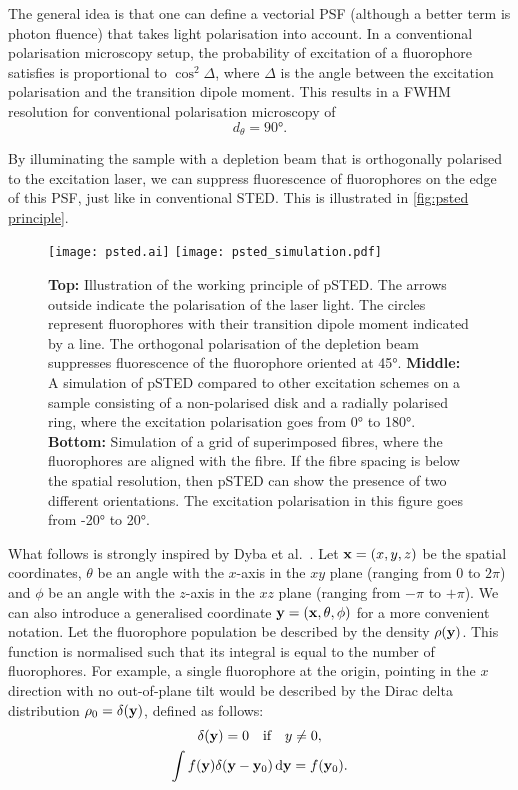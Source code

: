 The general idea is that one can define a vectorial PSF (although a better term is photon fluence) that takes light polarisation into account. In a conventional polarisation microscopy setup, the probability of excitation of a fluorophore satisfies is proportional to $ \cos^2 \Delta $, where $ \Delta $ is the angle between the excitation polarisation and the transition dipole moment. This results in a FWHM resolution for conventional polarisation microscopy of 
\begin{equation}
	d_\theta = \ang{90}.
\end{equation}

By illuminating the sample with a depletion beam that is orthogonally polarised to the excitation laser, we can suppress fluorescence of fluorophores on the edge of this PSF, just like in conventional STED. This is illustrated in \autoref{fig:psted principle}.

\begin{figure}
	\centering
	\texttt{[image: psted.ai]}
	\texttt{[image: psted\_simulation.pdf]}
	\caption{
		\textbf{Top:} Illustration of the working principle of pSTED. The arrows outside indicate the polarisation of the laser light. The circles represent fluorophores with their transition dipole moment indicated by a line. The orthogonal polarisation of the depletion beam suppresses fluorescence of the fluorophore oriented at \ang{45}.
		\textbf{Middle:} A simulation of pSTED compared to other excitation schemes on a sample consisting of a non-polarised disk and a radially polarised ring, where the excitation polarisation goes from \ang{0} to \ang{180}.
		\textbf{Bottom:} Simulation of a grid of superimposed fibres, where the fluorophores are aligned with the fibre. If the fibre spacing is below the spatial resolution, then pSTED can show the presence of two different orientations. The excitation polarisation in this figure goes from \ang{-20} to \ang{+20}.
	}
	\label{fig:psted principle}
\end{figure}

What follows is strongly inspired by Dyba et al.~\cite{Dyba2005}. Let $ \vb{x} = (x, y, z)$ be the spatial coordinates, $ \theta $ be an angle with the $ x $-axis in the $ xy $ plane (ranging from $ 0 $ to $ 2\pi$) and $ \phi $ be an angle with the $ z $-axis in the $ xz $ plane (ranging from $ -\pi $ to $+\pi$). We can also introduce a generalised coordinate $ \vb{y} = (\vb{x}, \theta, \phi) $ for a more convenient notation.
Let the fluorophore population be described by the density $ \rho(\vb{y}) $. This function is normalised such that its integral is equal to the number of fluorophores. For example, a single fluorophore at the origin, pointing in the $ x $ direction with no out-of-plane tilt would be described by the Dirac delta distribution $ \rho_0 = \delta(\vb{y}) $, defined as follows:
\begin{gather}
	\delta(\vb{y}) = 0 \qq{if} y\neq0, \\
	\int f(\vb{y})\delta(\vb{y}-\vb{y}_0) \dd{\vb{y}} = f(\vb{y}_0).
\end{gather}

